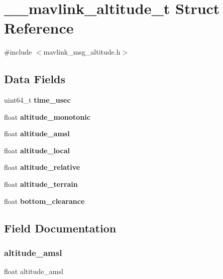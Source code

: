 \section{\+\_\+\+\_\+mavlink\+\_\+altitude\+\_\+t Struct Reference}
\label{struct____mavlink__altitude__t}


{\ttfamily \#include $<$mavlink\+\_\+msg\+\_\+altitude.\+h$>$}

\subsection*{Data Fields}
\begin{DoxyCompactItemize}
\item 
uint64\+\_\+t \textbf{ time\+\_\+usec}
\item 
float \textbf{ altitude\+\_\+monotonic}
\item 
float \textbf{ altitude\+\_\+amsl}
\item 
float \textbf{ altitude\+\_\+local}
\item 
float \textbf{ altitude\+\_\+relative}
\item 
float \textbf{ altitude\+\_\+terrain}
\item 
float \textbf{ bottom\+\_\+clearance}
\end{DoxyCompactItemize}


\subsection{Field Documentation}
\mbox{\label{struct____mavlink__altitude__t_a57db45bd49b8dde024241f50b8999e71}} 
\subsubsection{altitude\+\_\+amsl}
{\footnotesize\ttfamily float altitude\+\_\+amsl}

\mbox{\label{struct____mavlink__altitude__t_a7a318ae49293f4aad3a93a6c7d557684}} 
